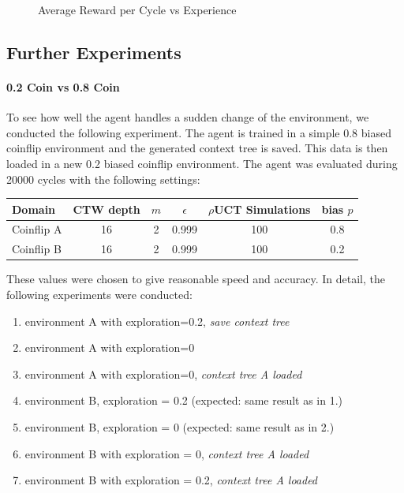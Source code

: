\documentclass[paper=a4, fontsize=11pt]{scrartcl} %
\numberwithin{equation}{section} %
\numberwithin{figure}{section} %
\numberwithin{table}{section} %
\begin{document}
\begin{figure}
\caption{\label{plot:rewards}Average Reward per Cycle vs Experience}
\end{figure}

\setlength\parindent{0pt}

\pagebreak
\subsection{Further Experiments}

\paragraph{0.2 Coin vs 0.8 Coin} To see how well the agent handles a sudden change of the environment, we conducted the following experiment. The agent is trained in a simple 0.8 biased coinflip environment and the generated context tree is saved. This data is then loaded in a new 0.2 biased coinflip environment. The agent was evaluated during 20000 cycles with the following settings:

\bigskip

\begin{tabular}{|l|c|c|c|c|c|}
\hline
Domain & CTW depth & $m$ & $\epsilon$ & $\rho$UCT Simulations & bias $p$\\\hline
Coinflip A & 16 & 2 & 0.999 & 100 & 0.8\\
Coinflip B & 16 & 2 & 0.999 & 100 & 0.2\\\hline
\end{tabular}

\bigskip

These values were chosen to give reasonable speed and accuracy. In detail, the following experiments were conducted:

\begin{enumerate}
 \setlength{\itemsep}{0cm}%
  \setlength{\parskip}{0cm}%
\item environment A with exploration=0.2,\emph{ save context tree}\label{coinflip_a_ct}
\item environment A with exploration=0
\item environment A with exploration=0, \emph{context tree A loaded}
\item environment B, exploration = 0.2 (expected: same result as in 1.)
\item environment B, exploration = 0 (expected: same result as in 2.)
\item environment B with exploration = 0, \emph{context tree A loaded}
\item environment B with exploration = 0.2, \emph{context tree A loaded}
\end{enumerate}
\end{document}
